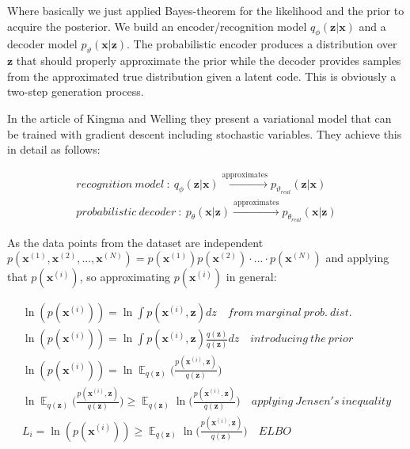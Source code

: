 \documentclass[11pt, english]{article}
\DeclareMathOperator*{\E}{\mathbb{E}}
\begin{document}
\vspace{3mm}

\par Where basically we just applied Bayes-theorem for the likelihood and the prior to acquire the posterior. We build an encoder/recognition model $q_{\phi}(\boldsymbol{\bm{z}} | \boldsymbol{\bm{x}})$ and a decoder model $p_{\vartheta}(\boldsymbol{\bm{x}} | \boldsymbol{\bm{z}})$. The probabilistic encoder produces a distribution over $\boldsymbol{\bm{z}}$ that should properly approximate the prior while the  decoder provides samples from the approximated true distribution given a latent code. This is obviously a two-step generation process. 

\vspace{3mm}

\par In the article of Kingma and Welling \cite{kingma2013auto} they present a variational model that can be trained with gradient descent including stochastic variables. They achieve this in detail as follows:

\vspace{3mm}

\begin{gather*}
    recognition\ model\ :\  q_{\phi}(\bm{z}|\bm{x}) \xrightarrow{\text{approximates}} p_{\vartheta_{real}}(\bm{z} | \bm{x}) \\
    probabilistic\ decoder\ :\ p_{\theta}(\bm{x} | \bm{z}) \xrightarrow{\text{approximates}} p_{\theta_{real}}(\bm{x} | \bm{z})
\end{gather*}

\vspace{3mm}

\par As the data points from the dataset are independent $p(\bm{x}^{(1)}, \bm{x}^{(2)}, ..., \bm{x}^{(N)}) = p(\bm{x}^{(1)})p(\bm{x}^{(2)})\cdot ... \cdot p(\bm{x}^{(N)})$ and applying that $p(\bm{x}^{(i)})$, so approximating $p(\bm{x}^{(i)})$ in general:

\vspace{3mm}

\begin{gather}
    \ln(p(\bm{x}^{(i)})) = \ln\int p(\bm{x}^{(i)}, \bm{z})dz \quad from\ marginal\ prob.\ dist.\\
    \ln(p(\bm{x}^{(i)})) = \ln\int p(\bm{x}^{(i)}, \bm{z})\frac{q(\bm{z})}{q(\bm{z})}dz \quad introducing\ the\ prior \\
    \ln(p(\bm{x}^{(i)})) = \ln \E_{q(\bm{z})} \Big( \frac{p(\bm{x}^{(i)}, \bm{z})}{q(\bm{z})}\Big) \\
    \ln \E_{q(\bm{z})} \Big( \frac{p(\bm{x}^{(i)}, \bm{z})}{q(\bm{z})}\Big) \geq \E_{q(\bm{z})} \ln\Big( \frac{p(\bm{x}^{(i)}, \bm{z})}{q(\bm{z})}\Big) \quad applying\ Jensen's\ inequality \\
    L_{i} = \ln(p(\bm{x}^{(i)})) \geq \E_{q(\bm{z})} \ln\Big( \frac{p(\bm{x}^{(i)}, \bm{z})}{q(\bm{z})}\Big) \quad ELBO
\end{gather}
\end{document}
